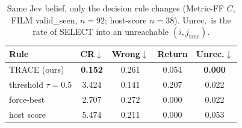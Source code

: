 \begin{table}[t]
\centering
\caption{Same Jev belief, only the decision rule changes (Metric-FF $C$, FILM valid\_seen, $n{=}92$; host-score $n{=}38$).
Unrec.\ is the rate of SELECT into an unreachable $(i,j_{\mathrm{true}})$.}
\label{tab:ffrules}
\scriptsize
\setlength{\tabcolsep}{3pt}
\begin{tabular}{lcccc}
\toprule
Rule & CR$\downarrow$ & Wrong$\downarrow$ & Return & Unrec.$\downarrow$ \\
\midrule
TRACE (ours) & \textbf{0.152} & 0.261 & 0.054 & \textbf{0.000} \\
threshold $\tau{=}0.5$ & 3.424 & 0.141 & 0.207 & 0.022 \\
force-best & 2.707 & 0.272 & 0.000 & 0.022 \\
host score & 5.474 & 0.211 & 0.000 & 0.053 \\
\bottomrule
\end{tabular}
\end{table}
